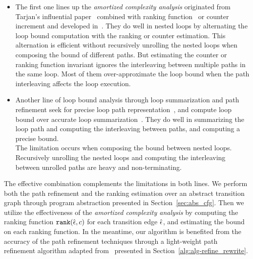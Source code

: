\begin{itemize}
  \item The first one lines up the \emph{amortized complexity analysis} originated from Tarjan's influential paper~\cite{PotechinP17} combined with ranking function~\cite{BradleyMS05} or counter increment and developed in~\cite{ZulegerGSV11,SinnZV14,SinnZV17,LuCT21,AliasDFG10}.
  They do well in nested loops by alternating the loop bound computation with the ranking or counter estimation. This alternation is efficient without recursively unrolling the nested loops when composing the bound of different paths.
 But estimating the counter or ranking function invariant ignores the interleaving between multiple paths in the same loop.
Most of them over-approximate the loop bound when the path interleaving affects the loop execution.
  \item 
  Another line of loop bound analysis through loop summarization and path refinement seek for precise loop path representation~\cite{ManoliosV06,BalakrishnanSIG09,SharmaDDA11,Flores-MontoyaH14,HumenbergerJK18,CyphertBKR19}, and compute loop bound over accurate loop summarization~\cite{GulwaniJK09,ZulegerGSV11}.
  They do well in summarizing the loop path and computing the interleaving between paths, and computing a precise bound.
  \\
  The limitation occurs when composing the bound between nested loops. Recursively unrolling the nested loops and computing the interleaving between unrolled paths are heavy and non-terminating.
\end{itemize}
The effective combination complements the limitations in both lines. 
We perform both the path refinement and the ranking estimation over an abstract transition graph through program abstraction presented in Section~\ref{sec:abs_cfg}.
Then we utilize the effectiveness of the \emph{amortized complexity analysis} by computing the ranking function $\mathtt{rank}(\hat{\mathtt{\epsilon}{}}, c)$ for each transition edge $\hat{\mathtt{\epsilon}{}}$, and estimating the bound on each ranking function.
In the meantime, our algorithm is benefited from the accuracy of the path refinement techniques through a light-weight path refinement algorithm adapted from~\cite{GulwaniJK09} presented in Section~\ref{alg:alg-refine_rewrite}.

